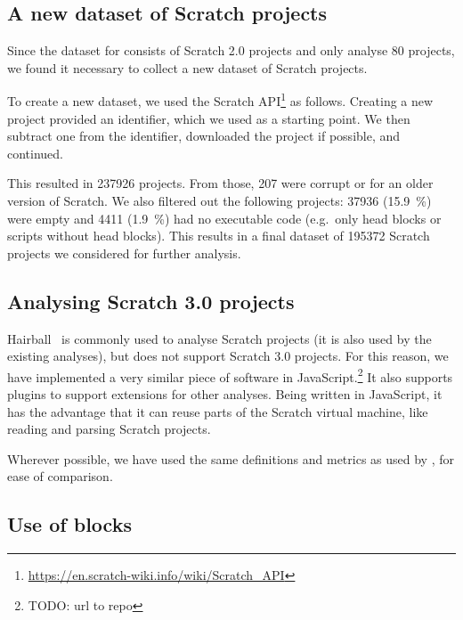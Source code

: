\documentclass[../main]{subfiles}
\begin{document}
\subsection{A new dataset of Scratch projects}\label{subsec:a-new-dataset-of-scratch-projects}

Since the dataset for \textcite{aivaloglouHowKidsCode2016} consists of Scratch 2.0 projects and \textcite{fronzaApproachEvaluateComplexity2020} only analyse 80 projects, we found it necessary to collect a new dataset of Scratch projects.

To create a new dataset, we used the Scratch API\footnote{\url{https://en.scratch-wiki.info/wiki/Scratch_API}} as follows.
Creating a new project provided an identifier, which we used as a starting point.
We then subtract one from the identifier, downloaded the project if possible, and continued.

This resulted in \num{237926} projects.
From those, \num{207} were corrupt or for an older version of Scratch.
We also filtered out the following projects: \num{37936} (\qty{15.9}{\percent}) were empty and \num{4411} (\qty{1.9}{\percent}) had no executable code (e.g.\ only head blocks or scripts without head blocks).
This results in a final dataset of \num{195372} Scratch projects we considered for further analysis.

\subsection{Analysing Scratch 3.0 projects}\label{subsec:analysing-scratch-3.0-projects}

Hairball~\autocite{boeHairballLintinspiredStatic2013} is commonly used to analyse Scratch projects (it is also used by the existing analyses), but does not support Scratch 3.0 projects.
For this reason, we have implemented a very similar piece of software in JavaScript.\footnote{TODO: url to repo}
It also supports plugins to support extensions for other analyses.
Being written in JavaScript, it has the advantage that it can reuse parts of the Scratch virtual machine, like reading and parsing Scratch projects.

Wherever possible, we have used the same definitions and metrics as used by \textcite{aivaloglouHowKidsCode2016}, for ease of comparison.

\subsection{Use of blocks}\label{subsec:use-of-blocks}
\end{document}

